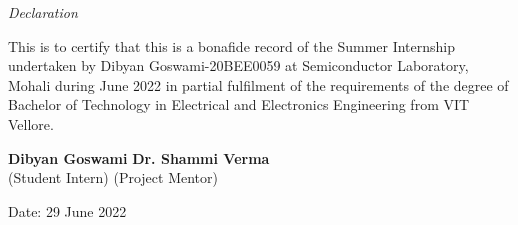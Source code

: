 \newpage
\thispagestyle{empty}

\begin{center}


\emph{\huge Declaration}\\[2.5cm]
\end{center}
\normalsize This is to certify that this is a bonafide record of the Summer Internship undertaken by Dibyan Goswami-20BEE0059 at Semiconductor Laboratory, Mohali during June 2022 in partial fulfilment of the requirements of the degree of Bachelor of Technology in Electrical and Electronics Engineering from VIT Vellore.\\[1.0cm]





\vfill


\vspace{2in}

\noindent\textbf{Dibyan Goswami}
\hfill
\textbf{{Dr. Shammi Verma}} \\
(Student Intern)
\hfill
(Project Mentor)


\vspace*{\fill}\begin{flushleft}
Date: 29 June 2022
\end{flushleft}

